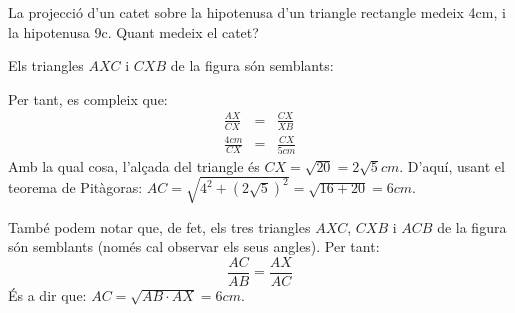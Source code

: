 \Exercise

La projecció d'un catet sobre la hipotenusa d'un triangle rectangle medeix 4cm, i la hipotenusa 9c. Quant medeix el catet?

\Answer

Els triangles $AXC$ i $CXB$ de la figura són semblants:
\begin{center}
\end{center}

  Per tant, es compleix que:
  \begin{eqnarray*}
    \frac{AX}{CX}&=&\frac{CX}{XB}\\
    \frac{4cm}{CX}&=&\frac{CX}{5cm}
  \end{eqnarray*}
  Amb la qual cosa, l'alçada del triangle és $CX=\sqrt{20}=2\sqrt{5}cm$. D'aquí, usant el teorema de Pitàgoras: $AC=\sqrt{4^2+(2\sqrt{5})^2}=\sqrt{16+20}=6cm$.

  També podem notar que, de fet, els tres triangles $AXC$, $CXB$ i $ACB$ de la figura són semblants (només cal observar els seus angles). Per tant:
  \[
    \frac{AC}{AB}=\frac{AX}{AC}  
  \]
  És a dir que: $AC=\sqrt{AB\cdot AX}=6cm$.